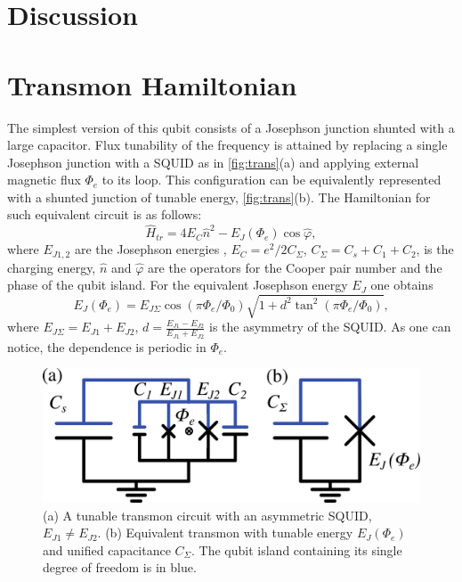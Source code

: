 \documentclass[%
 aip,
 draft,
 amsmath,amssymb,
 reprint,%
]{revtex4-1}
\begin{document}
\section{Discussion}



\appendix



\section{Transmon Hamiltonian}\label{sec:transmon}

The simplest version of this qubit consists of a Josephson junction shunted with a large capacitor. Flux tunability of the frequency is attained by replacing a single Josephson junction with a SQUID as in \autoref{fig:trans}(a) and applying external magnetic flux $\Phi_e$ to its loop. This configuration can be equivalently represented with a shunted junction of tunable energy, \autoref{fig:trans}(b). The Hamiltonian for such equivalent circuit is as follows: 
\begin{equation}
\hat{H}_{tr} = 4E_C \hat n^2 - E_J(\Phi_e) \cos \hat\varphi,
\label{eq:tr_ham}
\end{equation}
where $E_{J1,2}$ are the Josephson energies , $E_C = e^2/2C_{\Sigma}$, $C_{\Sigma} = C_s + C_1 +C_2$, is the charging energy, $\hat n$ and $\hat \varphi$ are the operators for the Cooper pair number and the phase of the qubit island. For the equivalent Josephson energy $E_{J}$ one obtains
\begin{equation}
E_{J}(\Phi_e) = E_{J\Sigma}\cos\left(\pi \Phi_e/\Phi_0\right) \sqrt{1+d^2 \tan^2 \left(\pi \Phi_e/\Phi_0\right)},
\label{eq:EJ_Phie}
\end{equation}  
where $E_{J\Sigma} = E_{J1}+E_{J2}$, $d = \frac{E_{J1}-E_{J2}}{E_{J1}+E_{J2}}$ is the asymmetry of the SQUID. As one can notice, the dependence is periodic in $\Phi_e$.
\begin{figure}
	\centering
	\includegraphics[width=\linewidth]{transmon}
	\caption{(a) A tunable transmon circuit with an asymmetric SQUID, $E_{J1} \neq E_{J2}$. (b) Equivalent transmon with tunable energy $E_{J}(\Phi_e)$ and unified capacitance $C_{\Sigma}$. The qubit island containing its single degree of freedom is in blue.}
	\label{fig:trans}
\end{figure}
\end{document}
